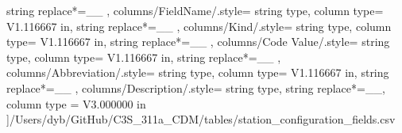 \begin{landscape}
{            string replace*={_}{\_}
        },
    columns/FieldName/.style={
            string type, 
            column type= V{1.116667 in}, 
            string replace*={_}{\_}
        },
    columns/Kind/.style={
            string type, 
            column type= V{1.116667 in}, 
            string replace*={_}{\_}
        },
    columns/Code Value/.style={
            string type, 
            column type= V{1.116667 in}, 
            string replace*={_}{\_}
        },
    columns/Abbreviation/.style={
            string type, 
            column type= V{1.116667 in}, 
            string replace*={_}{\_}
        },
    columns/Description/.style={
            string type, 
            string replace*={_}{\_},
            column type = V{3.000000 in}
        }
    ]{/Users/dyb/GitHub/C3S_311a_CDM/tables/station_configuration_fields.csv}
\end{landscape}
